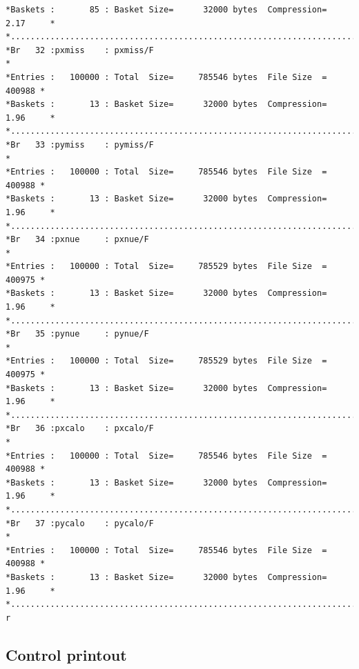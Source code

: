 {\begin{verbatim}
*Baskets :       85 : Basket Size=      32000 bytes  Compression=   2.17     *
*............................................................................*
*Br   32 :pxmiss    : pxmiss/F                                               *
*Entries :   100000 : Total  Size=     785546 bytes  File Size  =     400988 *
*Baskets :       13 : Basket Size=      32000 bytes  Compression=   1.96     *
*............................................................................*
*Br   33 :pymiss    : pymiss/F                                               *
*Entries :   100000 : Total  Size=     785546 bytes  File Size  =     400988 *
*Baskets :       13 : Basket Size=      32000 bytes  Compression=   1.96     *
*............................................................................*
*Br   34 :pxnue     : pxnue/F                                                *
*Entries :   100000 : Total  Size=     785529 bytes  File Size  =     400975 *
*Baskets :       13 : Basket Size=      32000 bytes  Compression=   1.96     *
*............................................................................*
*Br   35 :pynue     : pynue/F                                                *
*Entries :   100000 : Total  Size=     785529 bytes  File Size  =     400975 *
*Baskets :       13 : Basket Size=      32000 bytes  Compression=   1.96     *
*............................................................................*
*Br   36 :pxcalo    : pxcalo/F                                               *
*Entries :   100000 : Total  Size=     785546 bytes  File Size  =     400988 *
*Baskets :       13 : Basket Size=      32000 bytes  Compression=   1.96     *
*............................................................................*
*Br   37 :pycalo    : pycalo/F                                               *
*Entries :   100000 : Total  Size=     785546 bytes  File Size  =     400988 *
*Baskets :       13 : Basket Size=      32000 bytes  Compression=   1.96     *
*............................................................................*
r\end{verbatim}
} 

\newpage
\subsection{Control printout}

